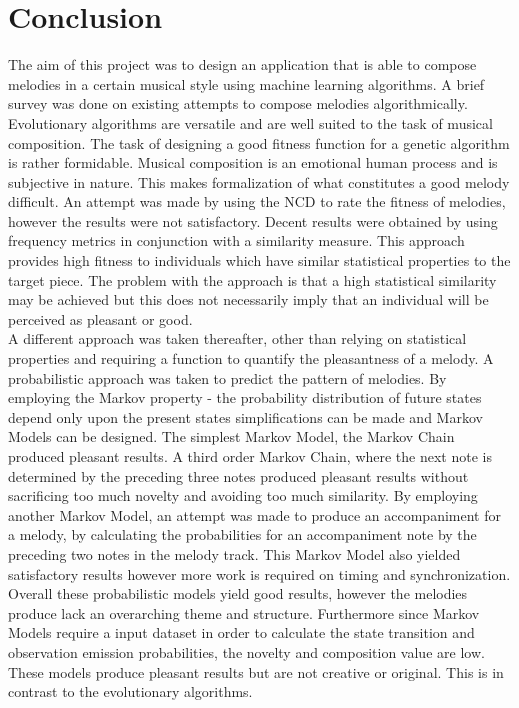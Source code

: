 \chapter{Conclusion}
The aim of this project was to design an application that is able to compose melodies in a certain musical style using machine learning algorithms. A brief survey was done on existing attempts to compose melodies algorithmically.
\\

Evolutionary algorithms are versatile and are well suited to the task of musical composition. The task of designing a good fitness function for a genetic algorithm is rather formidable.
Musical composition is an emotional human process and is subjective in nature. This makes formalization of what constitutes a good melody difficult. 
An attempt was made by using the \ac{NCD} to rate the fitness of melodies, however the results were not satisfactory.
Decent results were obtained by using frequency metrics in conjunction with a similarity measure. This approach provides high fitness to individuals which have similar statistical properties to the target piece. The problem with the approach is that a high statistical similarity may be achieved but this does not necessarily imply that an individual will be perceived as pleasant or good.
\\

A different approach was taken thereafter, other than relying on statistical properties and requiring a function to quantify the pleasantness of a melody. A probabilistic approach was taken to predict the pattern of melodies. By employing the Markov property - the probability distribution of future states depend only upon the present states simplifications can be made and Markov Models can be designed. The simplest Markov Model, the Markov Chain produced pleasant results. A third order Markov Chain, where the next note is determined by the preceding three notes produced pleasant results without sacrificing too much novelty and avoiding too much similarity. By employing another Markov Model, an attempt was made to produce an accompaniment for a melody, by calculating the probabilities for an accompaniment note by the preceding two notes in the melody track. This Markov Model also yielded satisfactory results however more work is required on timing and synchronization.
Overall these probabilistic models yield good results, however the melodies produce lack an overarching theme and structure. Furthermore since Markov Models require a input dataset in order to calculate the state transition and observation emission probabilities, the novelty and composition value are low. These models produce pleasant results but are not creative or original. This is in contrast to the evolutionary algorithms.
\\

